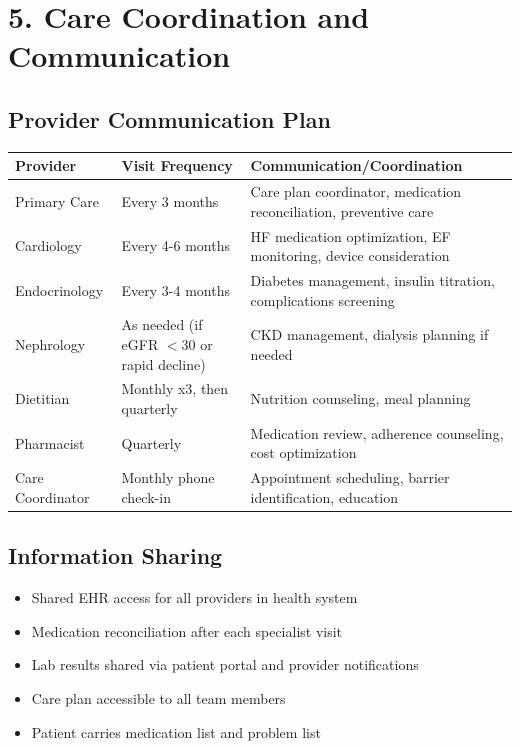 \documentclass[11pt,letterpaper]{article}
\begin{document}
\section*{5. Care Coordination and Communication}

\subsection*{Provider Communication Plan}

\begin{tabularx}{\textwidth}{|l|X|X|}
\hline
\textbf{Provider} & \textbf{Visit Frequency} & \textbf{Communication/Coordination} \\ \hline
Primary Care & Every 3 months & Care plan coordinator, medication reconciliation, preventive care \\ \hline
Cardiology & Every 4-6 months & HF medication optimization, EF monitoring, device consideration \\ \hline
Endocrinology & Every 3-4 months & Diabetes management, insulin titration, complications screening \\ \hline
Nephrology & As needed (if eGFR $<$30 or rapid decline) & CKD management, dialysis planning if needed \\ \hline
Dietitian & Monthly x3, then quarterly & Nutrition counseling, meal planning \\ \hline
Pharmacist & Quarterly & Medication review, adherence counseling, cost optimization \\ \hline
Care Coordinator & Monthly phone check-in & Appointment scheduling, barrier identification, education \\ \hline
\end{tabularx}

\subsection*{Information Sharing}

\begin{itemize}[leftmargin=*]
    \item Shared EHR access for all providers in health system
    \item Medication reconciliation after each specialist visit
    \item Lab results shared via patient portal and provider notifications
    \item Care plan accessible to all team members
    \item Patient carries medication list and problem list
\end{itemize}
\end{document}
